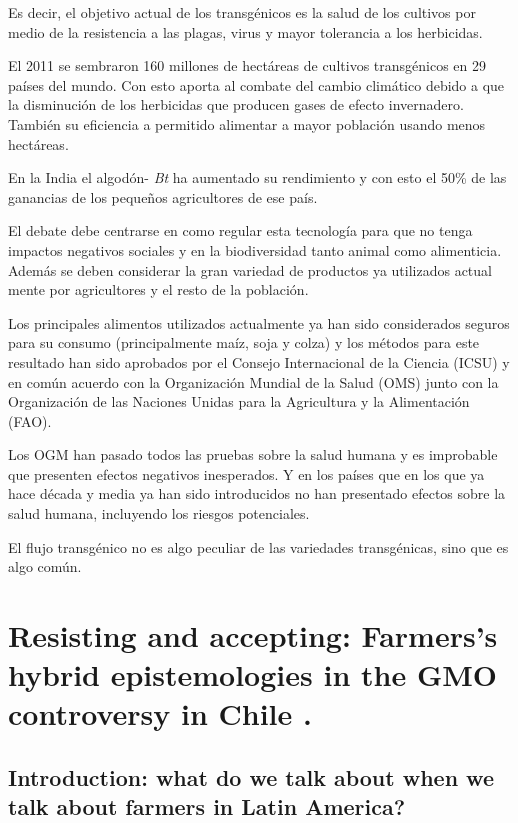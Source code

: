 \documentclass[11pt]{article}
\begin{document}
Es decir, el objetivo actual de los transgénicos es la salud de los cultivos por medio de la resistencia a las plagas, virus y mayor tolerancia a los herbicidas.

El 2011 se sembraron 160 millones de hectáreas de cultivos transgénicos en 29 países del mundo. Con esto aporta al combate del cambio climático debido a que la disminución de los herbicidas que producen gases de efecto invernadero. También su eficiencia a permitido alimentar a mayor población usando menos hectáreas.

En la India el algodón- \emph{Bt} ha aumentado su rendimiento y con esto el 50\% de las ganancias de los pequeños agricultores de ese país. 

El debate debe centrarse en como regular esta tecnología para que no tenga impactos negativos sociales y en la biodiversidad tanto animal como alimenticia. Además se deben considerar la gran variedad de productos ya utilizados actual mente por agricultores y el resto de la población.

Los principales alimentos utilizados actualmente ya han sido considerados seguros para su consumo (principalmente maíz, soja y colza) y los métodos para este resultado han sido aprobados por el Consejo Internacional de la Ciencia (ICSU) y en común acuerdo con la Organización Mundial de la Salud (OMS) junto con la Organización de las Naciones Unidas para la Agricultura y la Alimentación (FAO).

Los OGM han pasado todos las pruebas sobre la salud humana y es improbable que presenten efectos negativos inesperados. Y en los países que en los que ya hace década y media ya han sido introducidos no han presentado efectos sobre la salud humana, incluyendo los riesgos potenciales.

El flujo transgénico no es algo peculiar de las variedades transgénicas, sino que es algo común.

\section{Resisting and accepting: Farmers's hybrid epistemologies in the GMO controversy in Chile \cite{tironi-2013-resis-accep}.}
\label{sec:orgheadline5}

\subsection{Introduction: what do we talk about when we talk about farmers in Latin America?}
\label{sec:orgheadline2}
\end{document}
